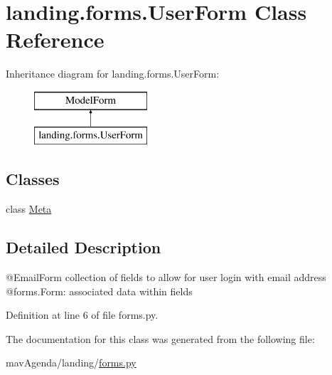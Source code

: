 \hypertarget{classlanding_1_1forms_1_1UserForm}{}\section{landing.\+forms.\+User\+Form Class Reference}
\label{classlanding_1_1forms_1_1UserForm}
Inheritance diagram for landing.\+forms.\+User\+Form\+:\begin{figure}[H]
\begin{center}
\leavevmode
\includegraphics[height=2.000000cm]{classlanding_1_1forms_1_1UserForm}
\end{center}
\end{figure}
\subsection*{Classes}
\begin{DoxyCompactItemize}
\item 
class \mbox{\hyperlink{classlanding_1_1forms_1_1UserForm_1_1Meta}{Meta}}
\end{DoxyCompactItemize}


\subsection{Detailed Description}
\begin{DoxyVerb}@EmailForm collection of fields to allow for user login with email address
@forms.Form: associated data within fields
\end{DoxyVerb}
 

Definition at line 6 of file forms.\+py.



The documentation for this class was generated from the following file\+:\begin{DoxyCompactItemize}
\item 
mav\+Agenda/landing/\mbox{\hyperlink{forms_8py}{forms.\+py}}\end{DoxyCompactItemize}
